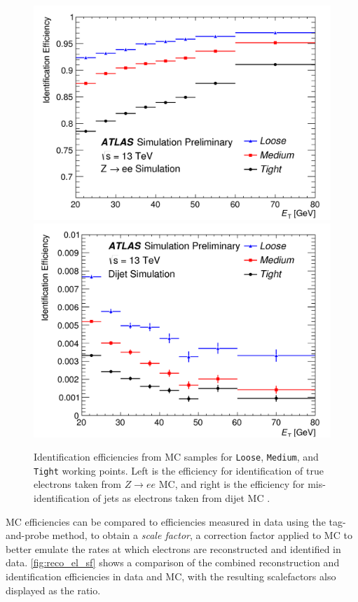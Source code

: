 \begin{centering}
\begin{figure}[!hbt]
\myfloatalign
\includegraphics[width=.48\linewidth]{figures/reco/fig_01a.png}
\includegraphics[width=.48\linewidth]{figures/reco/fig_01b.png}
\caption{ Identification efficiencies from \ac{MC} samples for \texttt{Loose}, \texttt{Medium}, and \texttt{Tight} working points. Left is the efficiency for identification of true electrons taken from $Z\rightarrow ee$ \ac{MC}, and right is the efficiency for mis-identification of jets as electrons taken from dijet \ac{MC} \cite{ATLAS-CONF-2016-024}.}
\label{fig:reco_el_eff}
\end{figure}
\end{centering}

\ac{MC} efficiencies can be compared to efficiencies measured in data using the tag-and-probe method, to obtain a \textit{scale factor}, a correction factor applied to \ac{MC} to better emulate the rates at which electrons are reconstructed and identified in data. \autoref{fig:reco_el_sf} shows a comparison of the combined reconstruction and identification efficiencies in data and \ac{MC}, with the resulting scalefactors also displayed as the ratio. 

